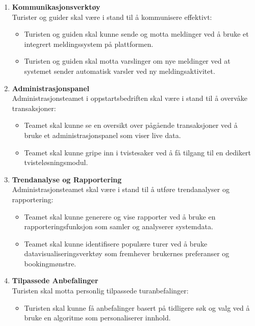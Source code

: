 \documentclass[../doc.tex]{subfiles}
\begin{document}
\begin{enumerate}
    \item \textbf{Kommunikasjonsverktøy} \\
    Turister og guider skal være i stand til å kommunisere effektivt:
    \begin{itemize}
        \item Turisten og guiden skal kunne sende og motta meldinger ved å bruke et integrert meldingssystem på plattformen.
        \item Turisten og guiden skal motta varslinger om nye meldinger ved at systemet sender automatisk varsler ved ny meldingsaktivitet.
    \end{itemize}
    \item \textbf{Administrasjonspanel} \\
    Administrasjonsteamet i oppstartsbedriften skal være i stand til å overvåke transaksjoner:
    \begin{itemize}
        \item Teamet skal kunne se en oversikt over pågående transaksjoner ved å bruke et administrasjonspanel som viser live data.
        \item Teamet skal kunne gripe inn i tvistesaker ved å få tilgang til en dedikert tvisteløsningsmodul.
    \end{itemize}

    \item \textbf{Trendanalyse og Rapportering} \\
    Administrasjonsteamet skal være i stand til å utføre trendanalyser og rapportering:
    \begin{itemize}
        \item Teamet skal kunne generere og vise rapporter ved å bruke en rapporteringsfunksjon som samler og analyserer systemdata.
        \item Teamet skal kunne identifisere populære turer ved å bruke datavisualiseringsverktøy som fremhever brukernes preferanser og bookingmønstre.
    \end{itemize}

    \item \textbf{Tilpassede Anbefalinger} \\
    Turisten skal motta personlig tilpassede turanbefalinger:
    \begin{itemize}
        \item Turisten skal kunne få anbefalinger basert på tidligere søk og valg ved å bruke en algoritme som personaliserer innhold.
    \end{itemize}


\end{enumerate}
\end{document}
